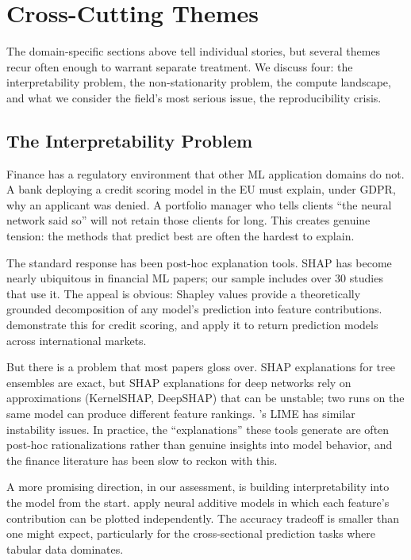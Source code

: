 \section{Cross-Cutting Themes}\label{sec:cross_cutting}

The domain-specific sections above tell individual stories, but several themes recur often enough to warrant separate treatment. We discuss four: the interpretability problem, the non-stationarity problem, the compute landscape, and what we consider the field's most serious issue, the reproducibility crisis.

\subsection{The Interpretability Problem}

Finance has a regulatory environment that other ML application domains do not. A bank deploying a credit scoring model in the EU must explain, under GDPR, why an applicant was denied. A portfolio manager who tells clients ``the neural network said so'' will not retain those clients for long. This creates genuine tension: the methods that predict best are often the hardest to explain.

The standard response has been post-hoc explanation tools. SHAP \citep{Lundberg2017} has become nearly ubiquitous in financial ML papers; our sample includes over 30 studies that use it. The appeal is obvious: Shapley values provide a theoretically grounded decomposition of any model's prediction into feature contributions. \citet{Bussmann2021} demonstrate this for credit scoring, and \citet{Leippold2022} apply it to return prediction models across international markets.

But there is a problem that most papers gloss over. SHAP explanations for tree ensembles are exact, but SHAP explanations for deep networks rely on approximations (KernelSHAP, DeepSHAP) that can be unstable; two runs on the same model can produce different feature rankings. \citet{Ribeiro2016}'s LIME has similar instability issues. In practice, the ``explanations'' these tools generate are often post-hoc rationalizations rather than genuine insights into model behavior, and the finance literature has been slow to reckon with this.

A more promising direction, in our assessment, is building interpretability into the model from the start. \citet{Chang2021} apply neural additive models in which each feature's contribution can be plotted independently. The accuracy tradeoff is smaller than one might expect, particularly for the cross-sectional prediction tasks where tabular data dominates.


